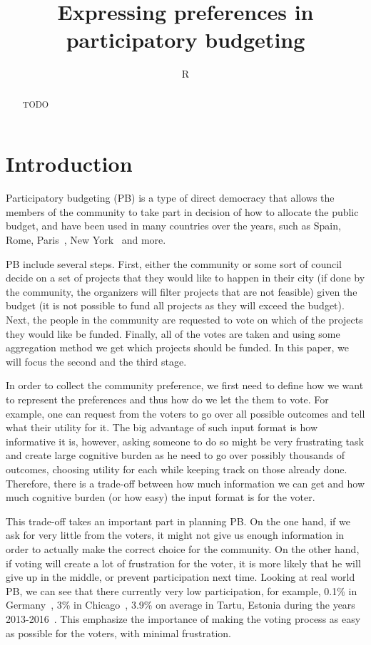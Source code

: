 \documentclass[10pt]{article}
\title{Expressing  preferences  in participatory budgeting}
\author{R}
\begin{document}
\maketitle

\begin{abstract}
    TODO
\end{abstract}

\section{Introduction}\label{sec:intro}

Participatory budgeting (PB) is a type of direct democracy that allows the members of the community to take part in decision of how to allocate the public budget, and have been used in many countries over the years, such as Spain, Rome, Paris~\citep{sintomer2008participatory}, New York~\citep{su2017porto} and more. 

PB include several steps. First, either the community or some sort of council decide on a set of projects that they would like to happen in their city (if done by the community, the organizers will filter projects that are not feasible) given the budget (it is not possible to fund all projects as they will exceed the budget). Next, the people in the community are requested to vote on which of the projects they would like be funded. Finally, all of the votes are taken and using some aggregation method we get which projects should be funded. In this paper, we will focus the second and the third stage.

In order to collect the community preference, we first need to define how we want to represent the preferences and thus how  do we let the them to vote. For example, one can request from the voters to go over all possible outcomes and tell what their utility for it. The big advantage of such input format is how informative it is, however, asking someone to do so might be very frustrating task and create large cognitive burden as he need to go over possibly thousands of outcomes, choosing utility for each while keeping track on those already done. Therefore, there is a trade-off between how much information we can get and how much cognitive burden (or how easy) the input format is for the voter.

This trade-off takes an important part in planning PB. On the one hand, if we ask for very little from the voters, it might not give us enough information in order to actually make the correct choice for the community. On the other hand, if voting will create a lot of frustration for the voter, it is more likely that  he will give up in the middle, or prevent participation next time. Looking at real world PB, we can see that there currently very low participation, for example, 0.1\% in Germany~\citep{zepic2017participatory}, 3\% in Chicago~\citep{stewart2014participatory}, 3.9\% on average in Tartu, Estonia during the years 2013-2016~\citep{maeroe2021increasing}. This emphasize the importance of making the voting process as easy as possible for the voters, with minimal frustration.
\end{document}
